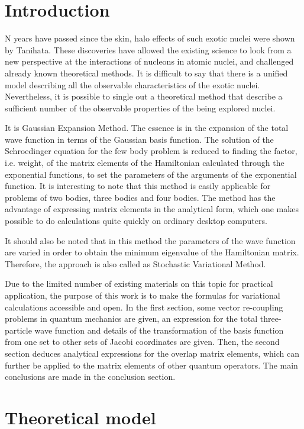 \documentclass[12pt,a4paper,twoside]{article}
\begin{document}
\section*{Introduction}

N years have passed since the skin, halo effects of such exotic nuclei were shown by Tanihata. These discoveries have allowed the existing science to look from a new perspective at the interactions of nucleons in atomic nuclei, and challenged already known theoretical methods. It is difficult to say that there is a unified model describing all the observable characteristics of the exotic nuclei. Nevertheless, it is possible to single out a theoretical method that describe a sufficient number of the observable properties of the being explored nuclei.


It is Gaussian Expansion Method. The essence is in the expansion of the total wave function in terms of the Gaussian basis function. The solution of the Schroedinger equation for the few body problem is reduced to finding the factor, i.e. weight, of the matrix elements of the Hamiltonian calculated through the exponential functions, to set the parameters of the arguments of the exponential function. It is interesting to note that this method is easily applicable for problems of two bodies, three bodies and four bodies. The method has the advantage of expressing matrix elements in the analytical form, which one makes possible to do calculations quite quickly on ordinary desktop computers.

It should also be noted that in this method the parameters of the wave function are varied in order to obtain the minimum eigenvalue of the Hamiltonian matrix. Therefore, the approach is also called as Stochastic Variational Method.

Due to the limited number of existing materials on this topic for practical application, the purpose of this work is to make the formulas for variational calculations accessible and open. In the first section, some vector re-coupling problems in quantum mechanics are given, an expression for the total three-particle wave function and details of the transformation of the basis function from one set to other sets of Jacobi coordinates are given. Then, the second section deduces analytical expressions for the overlap matrix elements, which can further be applied to the matrix elements of other quantum operators. The main conclusions are made in the conclusion section.

\section{Theoretical model}
\end{document}
